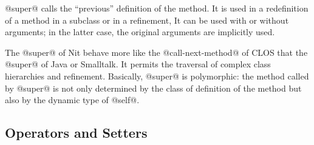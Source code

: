@super@ calls the ``previous'' definition of the method.
It is used in a redefinition of a method in a subclass or in a refinement,
It can be used with or without arguments; in the latter case, the original arguments are implicitly used.

The @super@ of Nit behave more like the @call-next-method@ of CLOS that the @super@ of Java or Smalltalk.
It permits the traversal of complex class hierarchies and refinement.
Basically, @super@ is polymorphic: the method called by @super@ is not only determined by the class of definition of the method but also by the dynamic type of @self@.

\begin{comment}
The principle it to produce a strict order of the redefinitions of a method (the linearization).
Each call to @super@ call the next method definition in the linearization.
From a technical point of view, the linearization algorithm used is based on C4.
It ensures that:
\begin{itemize}
\item A definition comes after its redefinition.
\item A redefinition in a refinement comes before a redefnition in a
\item The order of the declaration of the superclasses is used as the ultimate deabiguization.
\end{itemize}


\begin{lst}
class A
	fun derp: String do return "A"
end
class B
	super A
	redef fun derp do return "B" + super
end
class C
	super A
	redef fun derp do return "C" + super
end
class D
	super B
	super C
	redef fun derp do return "D" + super
	# Here the linearization order of the class D is DBCA
	# D before B because D specializes B
	# B before A because B specializes A 
	# D before C because D specializes C
	# C before A because C specializes A
	# B before C because in D 'super B' is before 'super C'  
end
var b = new B
print b.derp # outputs "BA"
var d = new D
print d.derp # outputs "DBCA"
\end{lst}
\end{comment}


\subsection{Operators and Setters}\label{operator}

